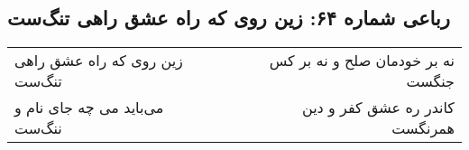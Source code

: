 \begin{center}
\section*{رباعی شماره ۶۴: زین روی که راه عشق راهی تنگ‌ست}
\label{sec:sh064}
\begin{longtable}{l p{0.5cm} r}
زین روی که راه عشق راهی تنگ‌ست
&&
نه بر خودمان صلح و نه بر کس جنگست
\\
می‌باید می چه جای نام و ننگ‌ست
&&
کاندر ره عشق کفر و دین همرنگست
\\
\end{longtable}
\end{center}
